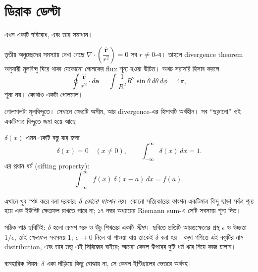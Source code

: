 \documentclass[11pt]{article}
\begin{document}
\section{ডিরাক ডেল্টা}

এখন একটি স্ববিরোধ, এবং তার সমাধান।

তৃতীয় অনুচ্ছেদের সমস্যায় দেখা গেছে $\nabla\cdot\left(
\dfrac{\hat{\mathbf{r}}}{r^{2}} \right) = 0$ সব $r \neq 0$-এ। তাহলে
divergence theorem অনুযায়ী মূলবিন্দু ঘিরে থাকা যেকোনো গোলকের flux শূন্য
হওয়া উচিত। অথচ সরাসরি হিসাব করলে
\[
  \oint \frac{\hat{\mathbf{r}}}{r^{2}}\cdot d\mathbf{a}
  = \int \frac{1}{R^{2}} R^{2}\sin\theta\,d\theta\,d\phi = 4\pi ,
\]
শূন্য নয়। কোথাও একটা গোলমাল।

গোলমালটা মূলবিন্দুতে। সেখানে ক্ষেত্রটি অসীম, আর divergence-এর হিসাবটি
অর্থহীন। সব ``ছড়ানো'' ওই একটিমাত্র বিন্দুতে জমা হয়ে আছে।

\begin{idea}[এক মাত্রায় ডেল্টা]
$\delta(x)$ এমন একটি বস্তু যার জন্য
\[
  \delta(x) = 0 \quad (x \neq 0), \qquad
  \int_{-\infty}^{\infty}\delta(x)\,dx = 1 .
\]
এর প্রধান ধর্ম (sifting property):
\[
  \int_{-\infty}^{\infty} f(x)\,\delta(x-a)\,dx = f(a) .
\]
\end{idea}

\begin{center}
\end{center}

\begin{remark}
এখানে খুব স্পষ্ট করে বলা দরকার: \emph{$\delta$ কোনো ফাংশন নয়}। কোনো
সত্যিকারের ফাংশন একটিমাত্র বিন্দু ছাড়া সর্বত্র শূন্য হয়ে এক ইউনিট
ক্ষেত্রফল রাখতে পারে না; ১৭ নম্বর অধ্যায়ের Riemann sum-এ সেটি সবসময়
শূন্য দিত।

সঠিক পাঠ ছবিটিই: $\delta$ হলো ক্রমশ সরু ও উঁচু শিখরের একটি \emph{সীমা}।
ছবিতে প্রতিটি আয়তক্ষেত্রের প্রস্থ $\epsilon$ ও উচ্চতা $1/\epsilon$, তাই
ক্ষেত্রফল সবসময় $1$; $\epsilon \to 0$ নিলে যা পাওয়া যায় তাকেই $\delta$ বলা
হয়। কড়া গণিতে এই বস্তুটির নাম distribution, এবং তার তত্ত্ব এই সিরিজের
বাইরে; আমরা কেবল উপরের দুটি ধর্ম ধরে নিয়ে কাজ চালাব।

ব্যবহারিক নিয়ম: $\delta$ একা দাঁড়িয়ে কিছু বোঝায় না, সে কেবল
ইন্টিগ্রালের ভেতরে অর্থবহ।
\end{remark}
\end{document}

